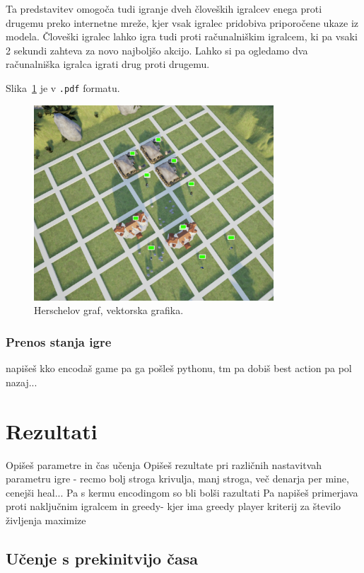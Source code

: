 \documentclass[a4paper, 12pt]{book}
\begin{document}
Ta predstavitev omogoča tudi igranje dveh človeških igralcev enega proti drugemu preko internetne mreže, kjer vsak igralec pridobiva priporočene ukaze iz modela.
Človeški igralec lahko igra tudi proti računalniškim igralcem, ki pa vsaki 2 sekundi zahteva za novo najboljšo akcijo.
Lahko si pa ogledamo dva računalniška igralca igrati drug proti drugemu.


Slika~\ref{visualization_ue4} je v {\tt .pdf} formatu.
\begin{figure}[h]
	\begin{center}
		\includegraphics[width=0.8\textwidth]{visualization_ue4.pdf}
	\end{center}
	\caption{Herschelov graf, vektorska grafika.}
	\label{visualization_ue4}
\end{figure}


\subsection{Prenos stanja igre}
napišeš kko encodaš game pa ga pošleš pythonu, tm pa dobiš best action pa pol nazaj...


\chapter{Rezultati}
\label{chrezultati}
Opišeš parametre in čas učenja
Opišeš rezultate pri različnih nastavitvah parametru igre - recmo bolj stroga krivulja, manj stroga, več denarja per mine, cenejši heal...
Pa s kermu encodingom so bli bolši razultati
Pa napišeš primerjava proti naključnim igralcem in greedy- kjer ima greedy player kriterij za število življenja maximize
\section{Učenje s prekinitvijo časa}
\end{document}
